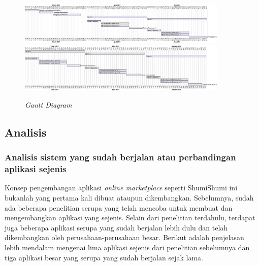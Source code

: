 \documentclass[a4paper]{article}
\newcommand{\subbab}[1]{%
    \subsection{#1}%
    \setcounter{figure}{0}
    \setcounter{table}{0}
}
\newcommand{\subsubbab}[1]{%
    \subsubsection{#1}%
}
\begin{document}
\begin{figure}[h]
    \centering
    \includegraphics*[width=10cm]{./images/gantt1/sprint timeline.png}
    \includegraphics*[width=10cm]{./images/gantt1/sprint timeline 2.png}
    \caption{\textit{Gantt Diagram}}
\end{figure}

\subbab{Analisis}
\subsubbab{Analisis sistem yang sudah berjalan atau perbandingan aplikasi sejenis}

Konsep pengembangan aplikasi \textit{online marketplace} seperti ShumiShumi ini bukanlah yang pertama kali dibuat ataupun dikembangkan. Sebelumnya, sudah ada beberapa penelitian serupa yang telah mencoba untuk membuat dan mengembangkan aplikasi yang sejenis. Selain dari penelitian terdahulu, terdapat juga beberapa aplikasi serupa yang sudah berjalan lebih dulu dan telah dikembangkan oleh perusahaan-perusahaan besar. Berikut adalah penjelasan lebih mendalam mengenai lima aplikasi sejenis dari penelitian sebelumnya dan tiga aplikasi besar yang serupa yang sudah berjalan sejak lama.
\end{document}
